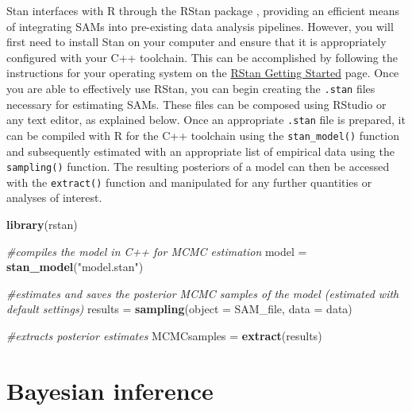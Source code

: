 \documentclass[
]{book}
\newenvironment{Shaded}{\begin{snugshade}}{\end{snugshade}}
\newcommand{\CommentTok}[1]{\textcolor[rgb]{0.56,0.35,0.01}{\textit{#1}}}
\newcommand{\DataTypeTok}[1]{\textcolor[rgb]{0.13,0.29,0.53}{#1}}
\newcommand{\KeywordTok}[1]{\textcolor[rgb]{0.13,0.29,0.53}{\textbf{#1}}}
\newcommand{\NormalTok}[1]{#1}
\newcommand{\StringTok}[1]{\textcolor[rgb]{0.31,0.60,0.02}{#1}}
\begin{document}
Stan interfaces with R through the RStan package \citep{Stan}, providing an efficient means of integrating SAMs into pre-existing data analysis pipelines. However, you will first need to install Stan on your computer and ensure that it is appropriately configured with your C++ toolchain. This can be accomplished by following the instructions for your operating system on the \href{https://github.com/stan-dev/rstan/wiki/RStan-Getting-Started}{RStan Getting Started} page. Once you are able to effectively use RStan, you can begin creating the \texttt{.stan} files necessary for estimating SAMs. These files can be composed using RStudio or any text editor, as explained below. Once an appropriate \texttt{.stan} file is prepared, it can be compiled with R for the C++ toolchain using the \texttt{stan\_model()} function and subsequently estimated with an appropriate list of empirical data using the \texttt{sampling()} function. The resulting posteriors of a model can then be accessed with the \texttt{extract()} function and manipulated for any further quantities or analyses of interest.

\begin{Shaded}
\begin{Highlighting}[]
\KeywordTok{library}\NormalTok{(rstan)}

\CommentTok{#compiles the model in C++ for MCMC estimation}
\NormalTok{model =}\StringTok{ }\KeywordTok{stan_model}\NormalTok{(}\StringTok{"model.stan"}\NormalTok{)}

\CommentTok{#estimates and saves the posterior MCMC samples of the model (estimated with default settings)}
\NormalTok{results =}\StringTok{ }\KeywordTok{sampling}\NormalTok{(}\DataTypeTok{object =}\NormalTok{ SAM_file, }\DataTypeTok{data =}\NormalTok{ data)}

\CommentTok{#extracts posterior estimates}
\NormalTok{MCMCsamples =}\StringTok{  }\KeywordTok{extract}\NormalTok{(results)}
\end{Highlighting}
\end{Shaded}

\hypertarget{bayesian-inference}{%
\section{Bayesian inference}\label{bayesian-inference}}
\end{document}
